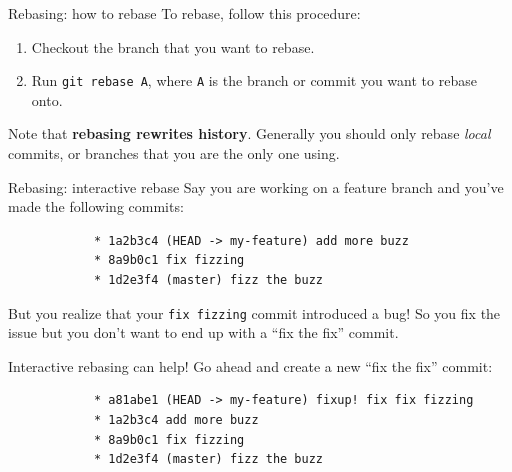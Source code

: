 \documentclass{beeper}
\begin{document}
\begin{frame}{Rebasing: how to rebase}
    To rebase, follow this procedure:

    \begin{enumerate}
        \item Checkout the branch that you want to rebase.
        \item Run \texttt{git rebase A}, where \texttt{A} is the branch or
            commit you want to rebase onto.
    \end{enumerate}
    \pause

    Note that \textbf{rebasing rewrites history}. Generally you should only
    rebase \textit{local} commits, or branches that you are the only one using.
\end{frame}

\begin{frame}[fragile]{Rebasing: interactive rebase}
    Say you are working on a feature branch and you've made the following
    commits:
    {
        \tiny
        \begin{verbatim}
            * 1a2b3c4 (HEAD -> my-feature) add more buzz
            * 8a9b0c1 fix fizzing
            * 1d2e3f4 (master) fizz the buzz
        \end{verbatim}
    }
    \pause

    But you realize that your \texttt{fix fizzing} commit introduced a bug! So
    you fix the issue but you don't want to end up with a ``fix the fix''
    commit.\\
    \pause

    Interactive rebasing can help! Go ahead and create a new ``fix the fix''
    commit:
    {
        \tiny
        \begin{verbatim}
            * a81abe1 (HEAD -> my-feature) fixup! fix fix fizzing
            * 1a2b3c4 add more buzz
            * 8a9b0c1 fix fizzing
            * 1d2e3f4 (master) fizz the buzz
        \end{verbatim}
    }
\end{frame}
\end{document}
